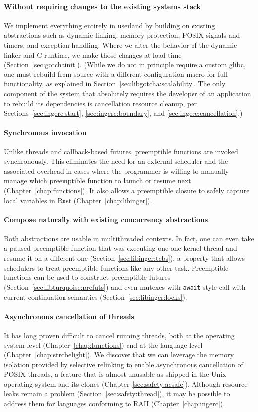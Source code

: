 \paragraph{Without requiring changes to the existing systems stack}
We implement everything entirely in userland by building on existing abstractions
such as dynamic linking, memory protection, POSIX signals and timers, and exception
handling.  Where we alter the behavior of the dynamic linker and C runtime, we make
those changes at load time (Section~\ref{sec:gotchainit}).  (While we do not in
principle require a custom glibc, one must rebuild from source with a different
configuration macro for full functionality, as explained in
Section~\ref{sec:libgotcha:scalability}.  The only component of the system that
absolutely requires the developer of an application to rebuild its dependencies is
cancellation resource cleanup, per Sections~\ref{sec:ingerc:start},
\ref{sec:ingerc:boundary}, and \ref{sec:ingerc:cancellation}.)

\paragraph{Synchronous invocation}
Unlike threads and callback-based futures, preemptible functions are invoked
synchronously.  This eliminates the need for an external scheduler and the associated
overhead in cases where the programmer is willing to manually manage which
preemptible function to launch or resume next (Chapter~\ref{chap:functions}).  It
also allows a preemptible closure to safely capture local variables in Rust
(Chapter~\ref{chap:libinger}).

\paragraph{Compose naturally with existing concurrency abstractions}
Both abstractions are usable in multithreaded contexts.  In fact, one can even take a
paused preemptible function that was executing one one kernel thread and resume it
on a different one (Section~\ref{sec:libinger:tcbs}), a property that allows
schedulers to treat preemptible functions like any other task.  Preemptible functions
can be used to construct preemptible futures (Section~\ref{sec:libturquoise:prefuts})
and even mutexes with \texttt{await}-style call with current continuation semantics
(Section~\ref{sec:libinger:locks}).

\paragraph{Asynchronous cancellation of threads}
It has long proven difficult to cancel running threads, both at the operating system
level (Chapter~\ref{chap:functions}) and at the language level
(Chapter~\ref{chap:strobelight}).  We
discover that we can leverage the memory isolation provided by selective relinking to
enable asynchronous cancellation of POSIX threads, a feature that is almost unusable
as shipped in the Unix operating system and its clones
(Chapter~\ref{sec:safety:acsafe}).  Although resource leaks remain a problem
(Section~\ref{sec:safety:thread}), it may be possible to address them for languages
conforming to RAII (Chapter~\ref{chap:ingerc}).

